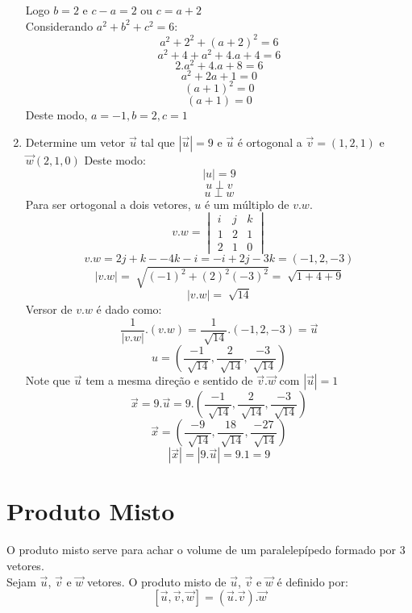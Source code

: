 \documentclass[ ]{article}
\begin{document}
\begin{enumerate}
				Logo $b=2$ e $c-a = 2$ ou $c=a+2$\\
				Considerando $a^2+b^2+c^2 = 6$:\\
				$$a^2+2^2+(a+2)^2=6$$
				$$a^2+4+a^2+4.a+4 = 6$$
				$$2.a^2+4.a+8 = 6$$
				$$a^2+2a+1=0$$
				$$(a+1)^2 = 0$$
				$$(a+1)=0$$
				Deste modo, $a=-1 , b=2 , c=1$
				\item Determine um vetor $\overrightarrow{u}$ tal que $|\overrightarrow{u}|=9$ e $\overrightarrow{u}$ é ortogonal a $\overrightarrow{v}= (1,2,1)$ e $\overrightarrow{w}(2,1,0)$
				Deste modo:
					$$|u|=9$$
					$$u \perp v$$
					$$u \perp w$$
					Para ser ortogonal a dois vetores, $u$ é um múltiplo de $v.w$.\\
					$$v.w = \begin{vmatrix}
						i &j&k\\
						1&2&1\\
						2&1&0
					\end{vmatrix}$$
					$$v.w=2j+k--4k-i= -i+2j-3k = (-1,2,-3)$$
					$$|v.w| = \sqrt[ ]{(-1)^2+(2)^2(-3)^2} = \sqrt[ ]{1+4+9}$$
					$$|v.w| = \sqrt[ ]{14}$$%
					Versor de  $v.w$ é dado como:
					$$\dfrac{1}{|v.w|}.(v.w)=\dfrac{1}{\sqrt[]{14}}.(-1,2,-3)=\overrightarrow{u}$$
					$$u= (\dfrac{-1}{\sqrt[ ]{14}}, \dfrac{2}{\sqrt[ ]{14}}, \dfrac{-3}{\sqrt[ ]{14}})$$
				Note que $\overrightarrow{u}$ tem a mesma direção e sentido de $\overrightarrow{v}.\overrightarrow{w}$ com $|\overrightarrow{u}|=1$
				$$\overrightarrow{x}=9.\overrightarrow{u} = 9.(\dfrac{-1}{\sqrt[ ]{14}}, \dfrac{2}{\sqrt[ ]{14}}, \dfrac{-3}{\sqrt[ ]{14}})$$
				$$\overrightarrow{x} = (\dfrac{-9}{\sqrt[ ]{14}}, \dfrac{18}{\sqrt[ ]{14}}, \dfrac{-27}{\sqrt[ ]{14}})$$
				$$|\overrightarrow{x}| = |9.\overrightarrow{u}|=9.1=9$$
			\end{enumerate}
	\section{Produto Misto}
	O produto misto serve para achar o volume de um paralelepípedo formado por 3 vetores.\\
	Sejam $\overrightarrow{u}$, $\overrightarrow{v}$ e $\overrightarrow{w}$ vetores. O produto misto de $\overrightarrow{u}$, $\overrightarrow{v}$ e $\overrightarrow{w}$ é definido por:
	$$[\overrightarrow{u},\overrightarrow{v},\overrightarrow{w}]= (\overrightarrow{u}.\overrightarrow{v}).\overrightarrow{w}$$
\end{document}
